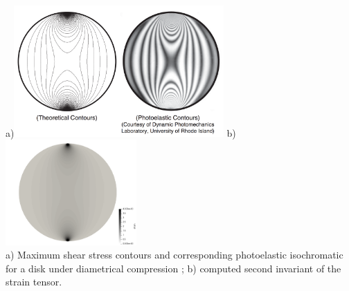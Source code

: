 \newpage

\begin{center}
a)\includegraphics[width=8cm]{python_codes/fieldstone_58/contours}
b)\includegraphics[width=5cm]{python_codes/fieldstone_58/results/111/e_2}\\
{\captionfont 
a) Maximum shear stress contours and corresponding photoelastic isochromatic 
for a disk under diametrical compression \cite{sadd14};
b) computed second invariant of the strain tensor.}
\end{center}

